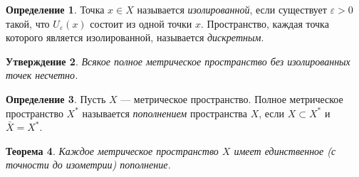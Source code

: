 \documentclass[12pt, titlepage, oneside]{amsbook}
\newtheorem{theorem}{Теорема}[chapter]
\newtheorem{claim}[theorem]{Утверждение}
\theoremstyle{definition}
\newtheorem{definition}[theorem]{Определение}
\theoremstyle{remark}
\begin{document}
\begin{definition}
Точка $x\in X$ называется \emph{изолированной}, если существует $\varepsilon>0$ такой, что $U_{\varepsilon}(x)$ состоит из одной точки $x$. Пространство, каждая точка которого является изолированной, называется \emph{дискретным}.
\end{definition}

\begin{claim}
\label{Pol4}
Всякое полное метрическое пространство без изолированных точек несчетно.
\end{claim}

\begin{definition}
Пусть $X$ --- метрическое пространство. Полное метрическое пространство $X^*$ называется \emph{пополнением} пространства $X$, если $X\subset X^*$ и $\bar{X}=X^*$.
\end{definition}

 \begin{theorem}
\label{Pol5}
Каждое метрическое пространство $X$ имеет единственное (с точности до изометрии) пополнение.
\end{theorem}
\end{document}
